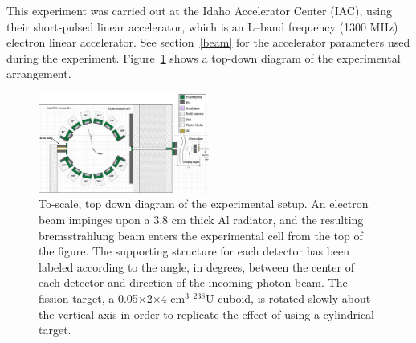 This experiment was carried out at the Idaho Accelerator Center (IAC), using their short-pulsed linear accelerator, which is an L--band frequency (1300 MHz) electron linear accelerator.
See section~\ref{beam} for the accelerator parameters used during the experiment.
Figure~\ref{fig:Facility} shows a top-down diagram of the experimental arrangement.

\begin{figure}[h]
\includegraphics[width=0.5\textwidth]{ExpArangment.png}
\caption{To-scale, top down diagram of the experimental setup.
An electron beam impinges upon a 3.8 cm thick Al radiator, and the resulting bremsstrahlung beam enters the experimental cell from the top of the figure.
The supporting structure for each detector has been labeled according to the angle, in degrees, between the center of each detector and direction of the incoming photon beam.
The fission target, a 0.05$\times$2$\times$4 cm$^3$ $^{238}$U cuboid, is rotated slowly about the vertical axis in order to replicate the effect of using a cylindrical target.
}
\label{fig:Facility}
\end{figure}
\figFacilityBarrier


